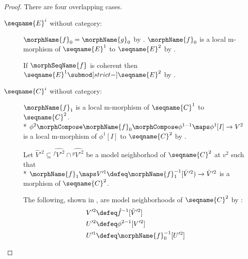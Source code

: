 \documentclass{article}
\begin{document}
\begin{lemma}
\begin{proof}
There are four overlapping cases.
\begin{description}
\item[$\seqname{E}^i$ without category:]
$\morphName{f}_0 = \morphName{g}_0$ by .
$\morphName{f}_0$ is a local m-morphism of $\seqname{E}^1$ to
$\seqname{E}^2$ by .

If $\morphSeqName{f}$ is coherent then
$\seqname{E}^1 \submod[strict-] \seqname{E}^2$ by
.

\item[$\seqname{C}^i$ without category:]
$\morphName{f}_1$ is a local m-morphism of $\seqname{C}^1$ to
$\seqname{C}^2$. \\*
$
  \phi^2 \morphCompose \morphName{f}_0 \morphCompose \phi^{1-1} \maps
  \phi^1[I] \to V^2
$
is a local m-morphism of $\phi^1[I]$ to $\seqname{C}^2$ by
.

Let $\hat{V}'^2 \subseteq \hat{^{f}V'^2} \cap \hat{^{g}V'^2}$ be a model
neighborhod of $\seqname{C}^2$ at $v^2$ such that \\*
$
  \morphName{f}_1 \maps V'^1 \defeq \morphName{f}_1^{-1}[\hat{V}'^2)
  \to \hat{V}'^2
$
is a morphism of $\seqname{C}^2$.

The following, shown in
{
  \showlabelsinline
  ,
}
are model
neighborhoods of $\seqname{C}^2$ by :
\begin{align*}
V'^2 & \defeq \hat{f}^{-1}[\hat{V}'^2]
\\*
U'^2 & \defeq \phi^{2-1}[V'^2]
\\*
U'^1 & \defeq \morphName{f}^{-1}_0[U'^2]
\end{align*}


\end{description}
\end{proof}
\end{lemma}
\end{document}
